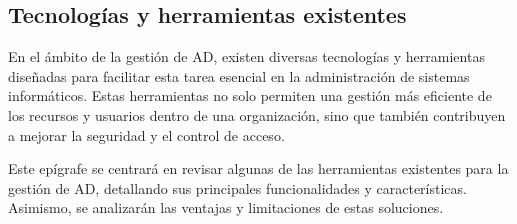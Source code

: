 \subsection{Tecnologías y herramientas existentes}

En el ámbito de la gestión de AD, existen diversas tecnologías y herramientas diseñadas para facilitar esta tarea esencial en la administración de sistemas informáticos. Estas herramientas no solo permiten una gestión más eficiente de los recursos y usuarios dentro de una organización, sino que también contribuyen a mejorar la seguridad y el control de acceso.

Este epígrafe se centrará en revisar algunas de las herramientas existentes para la gestión de AD, detallando sus principales funcionalidades y características. Asimismo, se analizarán las ventajas y limitaciones de estas soluciones.




